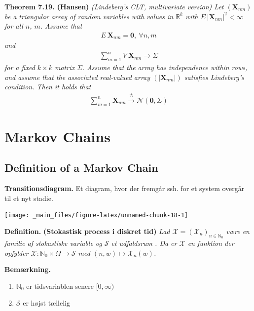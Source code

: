 \documentclass[
]{book}
\providecommand{\tightlist}{%
  \setlength{\itemsep}{0pt}\setlength{\parskip}{0pt}}
\begin{document}
\textbf{Theorem 7.19. (Hansen)} \emph{(Lindeberg's CLT, multivariate version) Let \((\mathbf{X}_{nm})\) be a triangular array of random variables with values in \(\mathbb{R}^k\) with \(E\ \vert \mathbf{X}_{nm}\vert^2<\infty\) for all \(n\), \(m\). Assume that}
\begin{align*}
    E\ \mathbf{X}_{nm}=\mathbf{0},\ \forall n,m
\end{align*}
\emph{and}
\begin{align*}
    \sum_{m=1}^n V\ \mathbf{X}_{nm}\to \Sigma
\end{align*}
\emph{for a fixed \(k\times k\) matrix \(\Sigma\). Assume that the array has independence within rows, and assume that the associated real-valued array \((\vert\mathbf{X}_{nm}\vert )\) satisfies Lindeberg's condition. Then it holds that}
\begin{align*}
    \sum_{m=1}^n\mathbf{X}_{nm}\stackrel{\mathcal{D}}{\to} \mathcal{N}(\mathbf{0},\Sigma)
\end{align*}

\hypertarget{markov-chains}{%
\chapter{Markov Chains}\label{markov-chains}}

\hypertarget{definition-of-a-markov-chain}{%
\section{Definition of a Markov Chain}\label{definition-of-a-markov-chain}}

\textbf{Transitionsdiagram.} Et diagram, hvor der fremgår ssh. for et system overgår til et nyt stadie.

\begin{center}\texttt{[image: \_main\_files/figure-latex/unnamed-chunk-18-1]} \end{center}

\textbf{Definition.} \textbf{(Stokastisk process i diskret tid)} \emph{Lad \(\mathcal{X}=(\mathcal{X}_n)_{n\in\mathbb{N}_0}\) være en familie af stokastiske variable og \(\mathcal{S}\) et udfaldsrum . Da er \(\mathcal{X}\) en funktion der opfylder \(\mathcal{X} : \mathbb{N}_0\times \Omega \to \mathcal{S}\) med \((n,w) \mapsto \mathcal{X}_n(w)\).}

\textbf{Bemærkning.}

\begin{enumerate}
\def\labelenumi{\roman{enumi}.}
\tightlist
\item
  \(\mathbb{N}_0\) er tidsvariablen senere \([0,\infty)\)
\item
  \(\mathcal{S}\) er højst tællelig
\end{enumerate}
\end{document}
